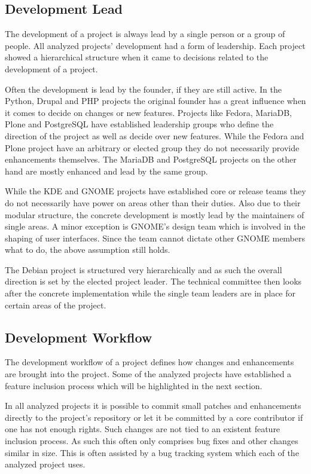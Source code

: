 \subsection{Development Lead} %

The development of a project is always lead by a single person or a group of
people. All analyzed projects' development had a form of leadership. Each
project showed a hierarchical structure when it came to decisions related to
the development of a project.

Often the development is lead by the founder, if they are still active. In the
Python, Drupal and PHP projects the original founder has a great influence when
it comes to decide on changes or new features. Projects like Fedora, MariaDB,
Plone and PostgreSQL have established leadership groups who define the
direction of the project as well as decide over new features. While the Fedora
and Plone project have an arbitrary or elected group they do not necessarily
provide enhancements themselves. The MariaDB and PostgreSQL projects on the
other hand are mostly enhanced and lead by the same group.

While the KDE and GNOME projects have established core or release teams they do
not necessarily have power on areas other than their duties. Also due to their
modular structure, the concrete development is mostly lead by the maintainers
of single areas. A minor exception is GNOME's design team which is involved in
the shaping of user interfaces. Since the team cannot dictate other GNOME
members what to do, the above assumption still holds.

The Debian project is structured very hierarchically and as such the overall
direction is set by the elected project leader. The technical committee then
looks after the concrete implementation while the single team leaders are in
place for certain areas of the project.


\subsection{Development Workflow} %

The development workflow of a project defines how changes and enhancements are
brought into the project. Some of the analyzed projects have established a
feature inclusion process which will be highlighted in the next section.

In all analyzed projects it is possible to commit small patches and
enhancements directly to the project's repository or let it be committed by a
core contributor if one has not enough rights. Such changes are not tied to an
existent feature inclusion process. As such this often only comprises bug fixes
and other changes similar in size. This is often assisted by a bug tracking
system which each of the analyzed project uses.

